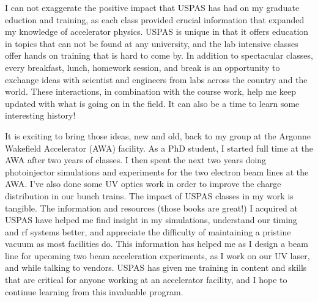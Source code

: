 \documentclass[11pt,a4paper,sans]{moderncv}        %
\begin{document}
I can not exaggerate the positive impact that USPAS has had on my graduate eduction and training, 
as each class provided crucial information that expanded my knowledge of accelerator physics. 
USPAS is unique in that it offers education in 
topics that can not be found at any university, and the lab intensive classes offer hands on training 
that is hard to come by. In addition to spectacular classes, every breakfast, lunch, homework session, 
and break is an opportunity to exchange ideas with scientist and engineers from labs across the country and the world.
These interactions, in combination with the course work, help me keep updated with what is going on in the field.
It can also be a time to learn some interesting history!

It is exciting to bring those ideas, new and old, back to my group at the 
Argonne Wakefield Accelerator (AWA) facility. As a PhD student, I started full time at the AWA 
after two years of classes. I then spent the next two years doing photoinjector 
simulations and experiments for the two electron beam lines at the AWA. 
I've also done some UV optics work in order to improve the charge distribution in our bunch trains. 
The impact of USPAS classes in my work is tangible. The information and resources (those books are great!) 
I acquired at USPAS have helped me find insight in my simulations, understand our timing and rf systems better, 
and appreciate the difficulty of maintaining a pristine vacuum as most facilities do. This information has helped me 
as I design a beam line for upcoming two beam acceleration experiments, as I work on our UV laser, and while
talking to vendors. USPAS has given me training in content and skills that are critical for anyone working
at an accelerator facility, and I hope to continue learning from this invaluable program.

\makeletterclosing

\end{document}
